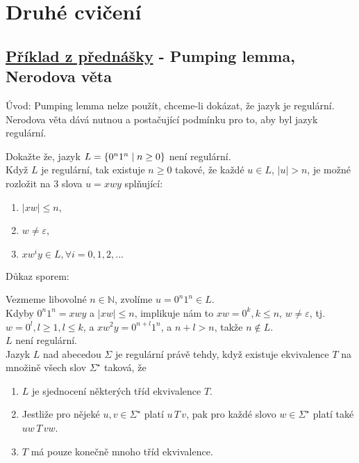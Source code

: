 \section{Druhé cvičení}

\subsection{\href{https://youtu.be/agNAMdc8zYY?list=PLQL6z4JeTTQkLuzI78OTnfYBclE1g0UjS&t=778}{Příklad z přednášky} - Pumping lemma, Nerodova věta}
Úvod: Pumping lemma nelze použít, chceme-li dokázat, že jazyk je regulární. Nerodova věta dává nutnou a postačující 
podmínku pro to, aby byl jazyk regulární. 

Dokažte že, jazyk $L = \left\lbrace 0^n 1^n \mid n \geq 0 \right\rbrace$ není regulární.\\ 

Když $L$ je regulární, tak existuje $n \geq 0$ takové, že každé ${u \in L}$,
$|u| > n$, je možné rozložit na 3 slova $u = xwy$ splňující:

\begin{enumerate}[1), noitemsep]
    \item $|xw| \leq n$,
    \item $w \not= \varepsilon$,
    \item $xw^i y \in L, \forall i = 0, 1, 2, ...$
\end{enumerate}

Důkaz sporem: 

Vezmeme libovolné $n \in \mathbb{N}$, zvolíme $u = 0^n1^n \in L$.\\
Kdyby $0^n1^n = xwy$ a $|xw| \leq n$, implikuje nám 
to $xw=0^k, k \leq n$, $w \neq \varepsilon$, tj. $w = 0^l, l \geq 1, l \leq k$, a $xw^2y = 0^{n+l} 1^n$, a $n+l > n$, 
takže $n \notin L$.\\
$L$ není regulární.\\

 Jazyk $L$ nad abecedou $\Sigma$ je regulární právě tehdy, když existuje ekvivalence $T$ na množině 
všech slov $\Sigma^{\star}$ taková, že 
\begin{enumerate}[1), noitemsep]
    \item $L$ je sjednocení některých tříd ekvivalence $T$. 
    \item Jestliže pro nějeké $u, v \in \Sigma^{\star}$ platí $u \, T \, v$, pak pro každé slovo $w \in \Sigma^{\star}$ platí také $uw\, T\, vw$. 
    \item $T$ má pouze konečně mnoho tříd ekvivalence. 
\end{enumerate}

